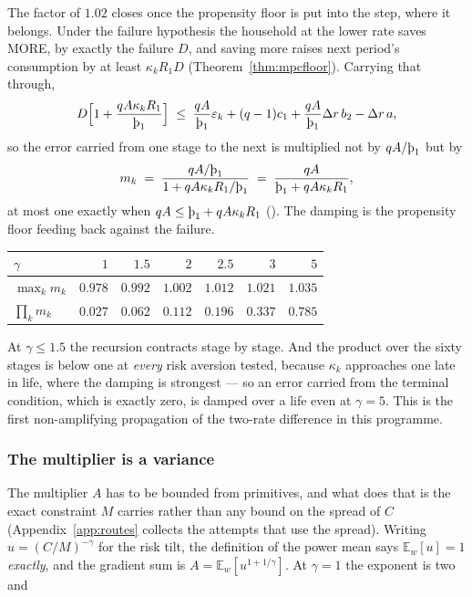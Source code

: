 The factor of $1.02$ closes once the propensity floor is put into the step, where it belongs. Under
the failure hypothesis the household at the lower rate saves MORE, by exactly the failure $D$, and
saving more raises next period's consumption by at least $\kappa_kR_1D$
(Theorem~\ref{thm:mpcfloor}). Carrying that through,
\[
  D\Bigl[1+\frac{qA\kappa_kR_1}{\Thorn_1}\Bigr]\;\le\;\frac{qA}{\Thorn_1}\varepsilon_k
   +(q-1)c_1+\frac{qA}{\Thorn_1}\Delta r\,b_2-\Delta r\,a ,
\]
so the error carried from one stage to the next is multiplied not by $qA/\Thorn_1$ but by
\[
  m_k\;=\;\frac{qA/\Thorn_1}{1+qA\kappa_kR_1/\Thorn_1}\;=\;\frac{qA}{\Thorn_1+qA\kappa_kR_1},
\]
at most one exactly when $qA\le\Thorn_1+qA\kappa_kR_1$
(). The damping is the propensity floor feeding back
against the failure.

\begin{center}
\begin{tabular}{lrrrrrr}
\toprule
$\gamma$ & $1$ & $1.5$ & $2$ & $2.5$ & $3$ & $5$\\
\midrule
$\max_k m_k$ & $\mathbf{0.978}$ & $\mathbf{0.992}$ & $1.002$ & $1.012$ & $1.021$ & $1.035$\\
$\prod_k m_k$ & $0.027$ & $0.062$ & $0.112$ & $0.196$ & $0.337$ & $0.785$\\
\bottomrule
\end{tabular}
\end{center}

At $\gamma\le1.5$ the recursion contracts stage by stage. And the product over the sixty stages is
below one at \emph{every} risk aversion tested, because $\kappa_k$ approaches one late in life, where
the damping is strongest --- so an error carried from the terminal condition, which is exactly zero, is
damped over a life even at $\gamma=5$. This is the first non-amplifying propagation of the two-rate
difference in this programme.

\subsubsection*{The multiplier is a variance}

The multiplier $A$ has to be bounded from primitives, and what does that is the exact constraint
$M$ carries rather than any bound on the spread of $C$ (Appendix~\ref{app:routes} collects the
attempts that use the spread). Writing $u=(C/M)^{-\gamma}$ for the risk
tilt, the definition of the power mean says $\mathbb E_w[u]=1$ \emph{exactly}, and the gradient sum
is $A=\mathbb E_w[u^{1+1/\gamma}]$. At $\gamma=1$ the exponent is two and

